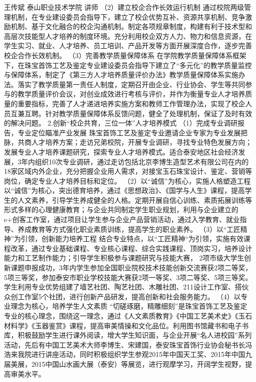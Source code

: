 王传斌
泰山职业技术学院
讲师
（2）建立校企合作长效运行机制 
通过校院两级管理机制，在专业建设委员会指导下，建立了校企优势互补、资源共享机制、竞争激励机制、基于文化融合的校企沟通机制。制定各项规章制度，构建有利于技术型和高层次技能型人才培养的制度环境。充分利用校企双方人力、物力和信息资源，在学生实习、就业、人才培养、员工培训、产品开发等方面开展深度合作，逐步完善校企合作长效机制。
（3）完善教学质量保障体系
在学院教学质量保障体系框架下，在珠宝首饰工艺及鉴定专业建设委员会指导下建立了“多元化”的教学质量监控与保障体系，制定了《第三方人才培养质量评价办法》教学质量保障体系实施办法。落实了教学质量第一责任人制度，定期召开由企业、行业协会、学生等共同参与的教学质量评价会议，对创业成效进行考核与评价，并作为衡量专业人才培养质量的重要指标，完善了人才递进培养实施方案和教师工作管理办法，实现了校企人员互兼互聘。针对教学质量保障体系反馈问题，健全了处理机制，保证了及时有效的解决问题。
2.创新“校企共育，三位一体”人才培养模式
（1）完成专业调研报告，专业定位瞄准产业发展
珠宝首饰工艺及鉴定专业邀请企业专家为专业发展把脉，共商人才培养方案；走访兄弟校院，开展专业调研，寻找专业特色发展方向；发展专业人才培养课题研究，探索专业人才培养模式。适合泰安地区社会经济发展，3年内组织10次专业调研，通过走访包括北京李博生造型艺术有限公司在内的18家区域内外企业，充分把握企业用人需求，对接宝玉石珠宝设计、鉴定、营销等岗位，确定专业人才培养目标和定位。
（2）以“诚信”为核心，实施人格塑造工程
以“诚信”为核心，突出德育培养，通过《思想政治》、《国学与人生》课程，提高学生的人文素养，引导学生养成健全的人格。定期开展自信心训练、素质拓展训练等形式多样的心理健康教育；与企业共同制定学生职业规划，利用与企业建立的e+创客工作室，通过项目让学生参与企业产品营销活动，通过入学教育、就业指导、养成教育等方式强化职业素质训练，提高学生的职业素养。
（3）以“工匠精神”为引领，创新能力培养工程
结合专业特点，以“工匠精神“为引领，实施有效课程改革，通过专业基础课程、专业核心课程、综合实践课程、顶岗实习，培养设计能力和工艺制作能力；引导学生积极参与课题研究与技能大赛， 2项市级大学生创新课题申报成功，3年内学生参加全国职业院校技术技能创新交流赛获2项二等奖，5项三等奖，参加泰安市职业学校技能大赛获2项一等奖、3项二等奖、5项三等奖。学生利用专业优势组建了墙艺社团、陶艺社团、木雕社团、211设计工作室、搭伙众创工作室5个社团，进行创新产品研发，提高创新和社会服务能力。
（4）以专业理念为核心，培养学生人文素质
“切磋琢磨，精雕细刻”是珠宝首饰工艺及鉴定专业的核心理念，围绕这一理念，通过《人文素质教育》《中国工艺美术史》《玉石材料学》《玉器鉴赏》课程，提高审美情操和文化品位。利用图书馆藏书和电子书库，积极鼓励学生进行课外阅读，增大学生知识面，与企业开展“名人进校园”系列活动，先后有中国工艺美术大师李博生、宋建国，泰安珠宝首饰行业协会秘书长冯浩来我院进行讲座活动，同时积极组织学生参观2015年中国天工奖、2015年中国九届美展，2015中国山水画大展（泰安）等展览，进行观摩学习，开阔学生视野，提高审美水平。


